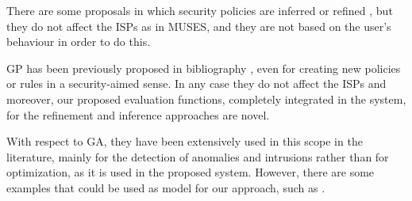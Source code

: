 There are some proposals in which security policies are inferred or refined \cite{inferring_policies_socialnetworks_09,policy_generation_clustering_10}, but they do not affect the ISPs as in MUSES, and they are not based on the user's behaviour in order to do this.

GP has been previously proposed in bibliography \cite{rule_generation_gp_09,sec_policy_evolution_gp_08}, even for creating new policies or rules in a security-aimed sense. In any case they do not affect the ISPs and moreover, our proposed evaluation functions, completely integrated in the system, for the refinement and inference approaches are novel.

With respect to GA, they have been extensively used in this scope in the literature, mainly for the detection of anomalies and intrusions rather than for optimization, as it is used in the proposed system. However, there are some examples that could be used as model for our approach, such as \cite{EAs_securitycosts-kirta,risk_reduction_ga_12}.

